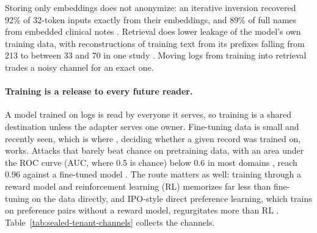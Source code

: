 Storing only embeddings does not anonymize: an iterative inversion recovered
92\% of 32-token inputs exactly from their embeddings, and 89\% of full names
from embedded clinical notes . Retrieval does lower
leakage of the model's own training data, with reconstructions of training text
from its prefixes falling from 213 to between 33 and 70 in one study
. Moving logs from training into retrieval trades a noisy
channel for an exact one.

\paragraph{Training is a release to every future reader.}
A model trained on logs is read by everyone it serves, so training is a shared
destination unless the adapter serves one owner. Fine-tuning data is small and
recently seen, which is where , deciding whether
a given record was trained on, works. Attacks that barely beat chance on
pretraining data, with an area under the ROC curve (AUC, where 0.5 is chance)
below 0.6 in most domains , reach 0.96 against a
fine-tuned model . The route matters as well: training
through a reward model and reinforcement learning (RL) memorizes far less than
fine-tuning on the data directly, and IPO-style direct preference learning,
which trains on preference pairs without a reward model, regurgitates more
than RL . Table~\ref{tab:sealed-tenant-channels} collects the
channels.

\pdmarginpagebreak

